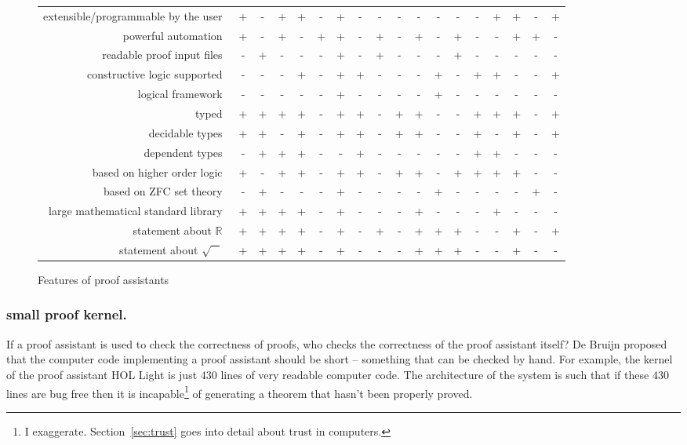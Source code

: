 \documentclass{llncs}
\newcommand{\ring}[1]{\mathbb{#1}}
\begin{document}
\begin{figure}
\begin{tabular}{|r|ccccc|ccccc|ccccc|cc|}
extensible/programmable by the user~
&+ &- &+ &+  &- &+ &- &-  &- &- &- &-  &- &+ &+ &-  &+ 
\\
powerful automation~
&+ &- &+ &-  &+ &+ &- &+  &- &+ &- &+  &- &- &+ &+  &- 
\\
readable proof input files~
&- &+ &- &-  &- &+ &- &+  &- &- &- &+  &- &- &- &-  &- 
\\
\hline
constructive logic supported~
&- &- &- &+  &- &+ &+ &-  &- &- &+ &-  &+ &+ &- &-  &+ 
\\
logical framework~
&- &- &- &-  &- &+ &- &-  &- &- &+ &-  &- &- &- &-  &- 
\\
typed~
&+ &+ &+ &+  &- &+ &+ &-  &+ &+ &- &-  &+ &+ &+ &-  &+ 
\\
decidable types~
&+ &+ &- &+  &- &+ &+ &-  &+ &+ &- &-  &+ &- &+ &-  &+ 
\\
dependent types~
&- &+ &+ &+  &- &- &+ &-  &- &- &- &-  &+ &+ &- &-  &- 
\\
\hline
based on higher order logic~
&+ &- &+ &+  &- &+ &+ &-  &+ &+ &- &+  &+ &+ &+ &-  &- 
\\
based on ZFC set theory~
&- &+ &- &-  &- &+ &- &-  &- &- &+ &-  &- &- &- &+  &- 
\\
large mathematical standard library~
&+ &+ &+ &+  &- &+ &- &-  &- &+ &- &-  &- &+ &- &-  &- 
\\
statement about $\ring{R}$~
&+ &+ &+ &+  &- &+ &- &+  &- &+ &+ &+  &- &- &+ &-  &+ 
\\
statement about $\sqrt{\phantom X}$~
&+ &+ &+ &+  &- &+ &- &-  &- &+ &+ &+  &- &- &+ &-  &- 
\\
\hline
\end{tabular}
\caption{Features of proof assistants}
\label{fig:feature}
\end{figure}


\bigskip 




\subsubsection{small proof kernel.} If a proof assistant is used to
check the correctness of proofs, who checks the correctness of the
proof assistant itself?  De Bruijn proposed that the computer code
implementing a proof assistant should be short -- something that
can be checked by hand.  For example, the kernel of the proof
assistant HOL Light is just $430$ lines of very readable computer
code.  The architecture of the system is such that if these $430$
lines are bug free then it is incapable\footnote{I
  exaggerate. Section~\ref{sec:trust} goes into detail about trust in
  computers.} of generating a theorem that hasn't been properly
proved.
\end{document}
